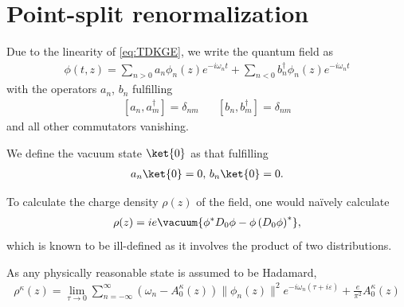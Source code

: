 \section{Point-split renormalization}

Due to the linearity of \eqref{eq:TDKGE}, we write the quantum field as 
\begin{align}
	\phi(t, z) = 
	\sum_{n>0}^{} a_n \phi_n(z) e^{-i\omega_n t}
	+ \sum_{n<0}^{} b_n^\dagger \phi_n(z) e^{-i\omega_n t}
\end{align}
with the operators $a_n$, $b_n$ fulfilling 
\begin{align}
	\left[ a_n, a_m^\dagger \right]  = \delta_{nm} \,\,\,\,\,\,\,\,\,\,
	\left[ b_n, b_m^\dagger \right]  = \delta_{nm}
\end{align}
and all other commutators vanishing.

We define the vacuum state $\ket{0}$ as that fulfilling 
\begin{align}
	a_n\ket{0} = 0, \,b_n\ket{0} = 0.
\end{align}

To calculate the charge density $\rho(z)$ of the field, one would naïvely calculate 
\begin{align}
	\rho(z) = ie\vacuum{\phi^* D_0 \phi - \phi \left( D_0 \phi \right) ^*},
\end{align}
which is known to be ill-defined as it involves the product of two distributions.

As any physically reasonable state is assumed to be Hadamard,  
\begin{align}
	\rho^{\kappa}(z) = 
	\lim_{\tau \to 0}
	\sum_{n=-\infty}^{\infty} (\omega_n - A_0^{\kappa}(z)) \|\phi_n(z)\|^2 e^{-i \omega_n (\tau + i\varepsilon)} 
	+ \frac{e}{\pi^2} A_0^{\kappa}(z)
\end{align}


\section{}


